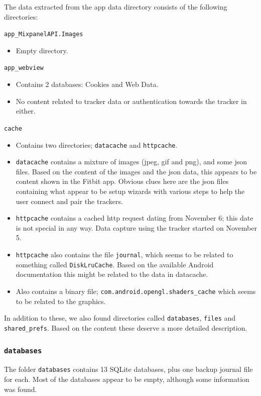 \documentclass[a4paper,11pt,dvips]{article}
\begin{document}
The data extracted from the app data directory consists of the following directories:

\vspace{1em}
\noindent
\texttt{app\_MixpanelAPI.Images}
\begin{itemize}
\item Empty directory.
\end{itemize}

\noindent
\texttt{app\_webview}
\begin{itemize}
\item Contains 2 databases: Cookies and Web Data.
\item No content related to tracker data or authentication towards the tracker in either.
\end{itemize}

\begin{samepage}
\noindent
\texttt{cache}
\begin{itemize}
\item Contains two directories; \texttt{datacache} and \texttt{httpcache}.
\item \texttt{datacache} contains a mixture of images (jpeg, gif and png), and some json files. Based on the content of the images and the json data, this appears to be content shown in the Fitbit app. Obvious clues here are the json files containing what appear to be setup wizards with various steps to help the user connect and pair the trackers.
\item \texttt{httpcache} contains a cached http request dating from November 6; this date is not special in any way. Data capture using the tracker started on November 5.
\item \texttt{httpcache} also contains the file \texttt{journal}, which seems to be related to something called \texttt{DiskLruCache}. Based on the available Android documentation this might be related to the data in datacache.
\item Also contains a binary file; \texttt{com.android.opengl.shaders\_cache} which seems to be related to the graphics.
\end{itemize}
\end{samepage}

\noindent
In addition to these, we also found directories called \texttt{databases}, \texttt{files} and \texttt{shared\_prefs}. Based on the content these deserve a more detailed description.

\subsubsection{\texttt{databases}}
The folder \texttt{databases} contains 13 SQLite databases, plus one backup journal file for each. Most of the databases appear to be empty, although some information was found.
\end{document}

